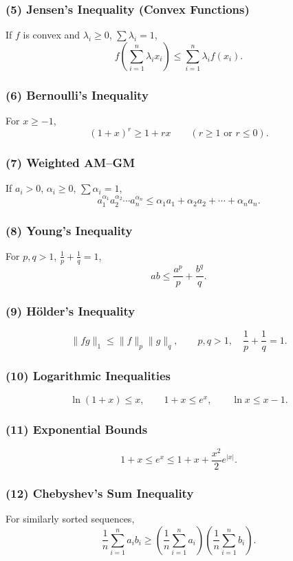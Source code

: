 \documentclass[10pt]{article}
\theoremstyle{definition}
\begin{document}
\subsubsection*{(5) Jensen's Inequality (Convex Functions)}
If \(f\) is convex and \(\lambda_i \ge 0\), \(\sum \lambda_i = 1\),
\[
f\!\left(\sum_{i=1}^n \lambda_i x_i\right)
\le
\sum_{i=1}^n \lambda_i f(x_i).
\]

\subsubsection*{(6) Bernoulli's Inequality}
For \(x \ge -1\),
\[
(1+x)^r \ge 1 + rx
\qquad (r \ge 1 \text{ or } r \le 0).
\]

\subsubsection*{(7) Weighted AM--GM}
If \(a_i > 0\), \(\alpha_i \ge 0\), \(\sum\alpha_i = 1\),
\[
a_1^{\alpha_1} a_2^{\alpha_2}\cdots a_n^{\alpha_n}
\le
\alpha_1 a_1 + \alpha_2 a_2 + \cdots + \alpha_n a_n.
\]

\subsubsection*{(8) Young's Inequality}
For \(p,q>1\), \(\tfrac{1}{p}+\tfrac{1}{q}=1\),
\[
ab \le \frac{a^p}{p} + \frac{b^q}{q}.
\]

\subsubsection*{(9) Hölder's Inequality}
\[
\|fg\|_1 \le \|f\|_p \|g\|_q,
\qquad
p,q>1,\quad \frac{1}{p}+\frac{1}{q}=1.
\]

\subsubsection*{(10) Logarithmic Inequalities}
\[
\ln(1+x)\le x,\qquad
1+x \le e^x,\qquad
\ln x \le x-1.
\]

\subsubsection*{(11) Exponential Bounds}
\[
1+x \le e^x \le 1 + x + \frac{x^2}{2}e^{|x|}.
\]

\subsubsection*{(12) Chebyshev's Sum Inequality}
For similarly sorted sequences,
\[
\frac{1}{n}\sum_{i=1}^n a_i b_i
\ge
\left(\frac{1}{n}\sum_{i=1}^n a_i\right)
\left(\frac{1}{n}\sum_{i=1}^n b_i\right).
\]
\end{document}
